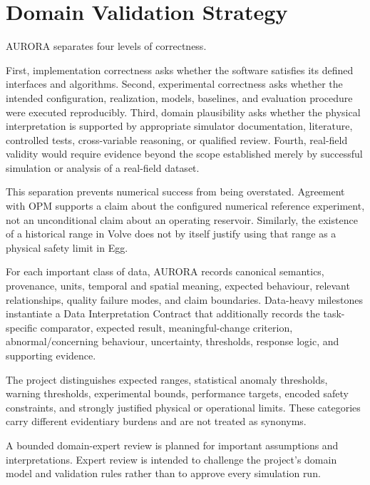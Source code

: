 \section{Domain Validation Strategy}
\label{sec:domain-validation}

AURORA separates four levels of correctness.

First, implementation correctness asks whether the software satisfies its defined
interfaces and algorithms. Second, experimental correctness asks whether the intended
configuration, realization, models, baselines, and evaluation procedure were executed
reproducibly. Third, domain plausibility asks whether the physical interpretation is
supported by appropriate simulator documentation, literature, controlled tests,
cross-variable reasoning, or qualified review. Fourth, real-field validity would
require evidence beyond the scope established merely by successful simulation or
analysis of a real-field dataset.

This separation prevents numerical success from being overstated. Agreement with OPM
supports a claim about the configured numerical reference experiment, not an
unconditional claim about an operating reservoir. Similarly, the existence of a
historical range in Volve does not by itself justify using that range as a physical
safety limit in Egg.

For each important class of data, AURORA records canonical semantics, provenance,
units, temporal and spatial meaning, expected behaviour, relevant relationships,
quality failure modes, and claim boundaries. Data-heavy milestones instantiate a
Data Interpretation Contract that additionally records the task-specific comparator,
expected result, meaningful-change criterion, abnormal/concerning behaviour,
uncertainty, thresholds, response logic, and supporting evidence.

The project distinguishes expected ranges, statistical anomaly thresholds, warning
thresholds, experimental bounds, performance targets, encoded safety constraints,
and strongly justified physical or operational limits. These categories carry
different evidentiary burdens and are not treated as synonyms.

A bounded domain-expert review is planned for important assumptions and
interpretations. Expert review is intended to challenge the project's domain model
and validation rules rather than to approve every simulation run.
